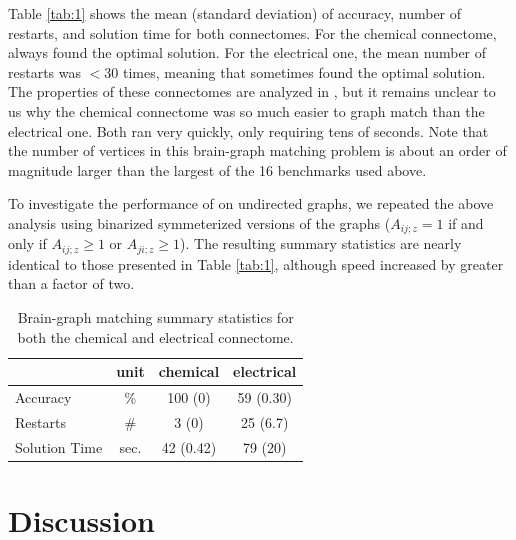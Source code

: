 \documentclass[10pt,journal,cspaper,compsoc]{IEEEtran}
\begin{document}
Table \ref{tab:1} shows the mean (standard deviation) of accuracy, number of restarts, and solution time for both connectomes.  For the chemical connectome, \faqap always found the optimal solution.  For the electrical one, the mean number of restarts was  $<30$ times, meaning that \faqap sometimes found the optimal solution. The properties of these connectomes are analyzed in \cite{Varshney2011}, but it remains unclear to us why the chemical connectome was so much easier to graph match than the electrical one. Both ran very quickly, only requiring tens of seconds.  Note that the number of vertices in this brain-graph matching problem is about an order of magnitude larger than the largest of the 16 benchmarks used above. 

% 

To investigate the performance of \faqap on undirected graphs, we repeated the above analysis using binarized symmeterized versions of the graphs ($A_{ij;z}=1$ if and only if $A_{ij;z}\geq 1$ or $A_{ji;z} \geq 1$).  The resulting summary statistics are nearly identical to those presented in Table \ref{tab:1}, although speed increased by greater than a factor of two.

\begin{table}
\caption{Brain-graph matching summary statistics for both the chemical and electrical connectome. }
	\label{tab:3}
\begin{center}
\begin{tabular}{|l|c|c|c|}
	\hline  		& unit		& chemical 	& electrical \\ \hline
	Accuracy  		& \%	  	& 100  (0)  & 59 (0.30)  \\
	Restarts 	  	& \#		& 3    (0)  & 25 (6.7)   \\
	Solution Time  	& sec.		& 42 (0.42)	& 79 (20)  	 \\ \hline
\end{tabular} 
\end{center}
\end{table}

 


\section{Discussion}
\end{document}
